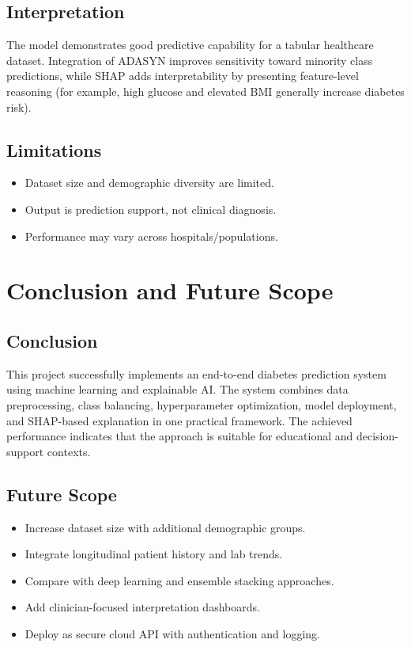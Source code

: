\documentclass[12pt,a4paper]{report}
\begin{document}
\section{Interpretation}
The model demonstrates good predictive capability for a tabular healthcare dataset. Integration of ADASYN improves sensitivity toward minority class predictions, while SHAP adds interpretability by presenting feature-level reasoning (for example, high glucose and elevated BMI generally increase diabetes risk).

\section{Limitations}
\begin{itemize}[leftmargin=1.2cm]
    \item Dataset size and demographic diversity are limited.
    \item Output is prediction support, not clinical diagnosis.
    \item Performance may vary across hospitals/populations.
\end{itemize}

\chapter{Conclusion and Future Scope}

\section{Conclusion}
This project successfully implements an end-to-end diabetes prediction system using machine learning and explainable AI. The system combines data preprocessing, class balancing, hyperparameter optimization, model deployment, and SHAP-based explanation in one practical framework. The achieved performance indicates that the approach is suitable for educational and decision-support contexts.

\section{Future Scope}
\begin{itemize}[leftmargin=1.2cm]
    \item Increase dataset size with additional demographic groups.
    \item Integrate longitudinal patient history and lab trends.
    \item Compare with deep learning and ensemble stacking approaches.
    \item Add clinician-focused interpretation dashboards.
    \item Deploy as secure cloud API with authentication and logging.
\end{itemize}
\end{document}

